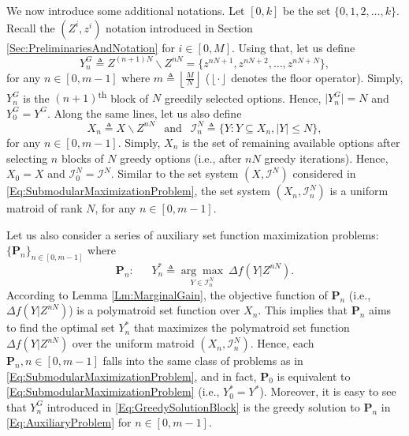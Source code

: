 \documentclass[conference]{IEEEtran}
\begin{document}
We now introduce some additional notations. Let $[0,k]$ be the set $\{0,1,2,\ldots,k\}$. Recall the $(Z^i,z^i)$ notation introduced in Section \ref{Sec:PreliminariesAndNotation} for $i\in [0,M]$. Using that, let us define
\begin{equation}\label{Eq:GreedySolutionBlock}
    Y^G_n \triangleq Z^{(n+1)N} \backslash Z^{nN} = \{z^{nN+1},z^{nN+2},\ldots,z^{nN+N}\}, 
\end{equation}
for any $n\in[0,m-1]$ where $m \triangleq \left \lfloor{\frac{M}{N}}\right \rfloor$ ($\left \lfloor{\cdot}\right \rfloor$ denotes the floor operator). Simply, $Y^G_n$ is the $(n+1)$\textsuperscript{th} block of $N$ greedily selected options. Hence, $\vert Y^G_n \vert = N$ and $Y^G_0 = Y^G$. Along the same lines, let us also define 
\begin{equation}\label{Eq:groundSetBlock}
X_n \triangleq X\backslash Z^{nN} \ \ \mbox{ and } \ \  \mathcal{I}_n^N \triangleq \{Y:Y \subseteq X_n, \vert Y \vert \leq N\},   
\end{equation}
for any $n\in[0,m-1]$. Simply, $X_n$ is the set of remaining available options after selecting $n$ blocks of $N$ greedy options (i.e., after $nN$ greedy iterations). Hence, $X_0 = X$ and $\mathcal{I}_0^N = \mathcal{I}^N$. Similar to the set system $(X,\mathcal{I}^N)$ considered in \eqref{Eq:SubmodularMaximizationProblem}, the set system $(X_n,\mathcal{I}_n^N)$ is a uniform matroid of rank $N$, for any $n\in[0,m-1]$. 


Let us also consider a series of auxiliary set function maximization problems: $\{\mathbf{P}_n\}_{n\in [0,m-1]}$ where 
\begin{equation}\label{Eq:AuxiliaryProblem}
    \mathbf{P}_n :\ \ \ \ \ \ \ Y^*_n \triangleq \underset{Y\in\mathcal{I}^N_n}{\arg\max}\ \Delta f(Y\vert Z^{nN}).
\end{equation}
According to Lemma \ref{Lm:MarginalGain}, the objective function of $\mathbf{P}_n$ (i.e., $\Delta f(Y\vert Z^{nN})$) is a polymatroid set function over $X_n$. This implies that $\mathbf{P}_n$ aims to find the optimal set $Y^*_n$ that maximizes the polymatroid set function $\Delta f(Y\vert Z^{nN})$ over the uniform matroid $(X_n,\mathcal{I}^N_n)$. Hence, each $\mathbf{P}_n, n\in [0,m-1]$ falls into the same class of problems as in \eqref{Eq:SubmodularMaximizationProblem}, and in fact, $\mathbf{P}_0$ is equivalent to \eqref{Eq:SubmodularMaximizationProblem} (i.e., $Y^*_0 = Y^*$). Moreover, it is easy to see that $Y^G_n$ introduced in \eqref{Eq:GreedySolutionBlock} is the greedy solution to $\mathbf{P}_n$ in \eqref{Eq:AuxiliaryProblem} for $n\in[0,m-1]$.  
\end{document}
